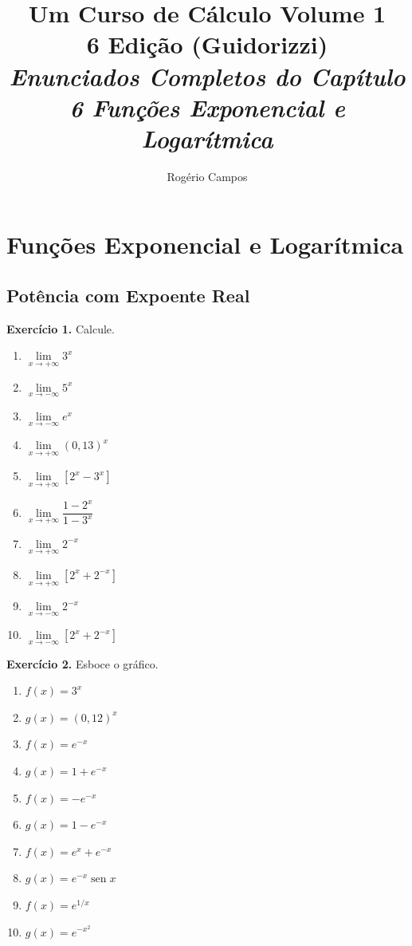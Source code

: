 \documentclass[12pt,a4paper]{article}
\title{
    \Huge \textbf{Um Curso de Cálculo Volume 1} \\
    \vspace{0.3cm}
    \Large 6\textordfeminine{} Edição (Guidorizzi) \\
    \vspace{0.5cm}
    \large \textit{Enunciados Completos do Capítulo 6 Funções Exponencial e Logarítmica}
}
\author{Rogério Campos}
\begin{document}
\maketitle
\newpage

\tableofcontents
\newpage

\setcounter{section}{5}
\setcounter{subsection}{0}

\section{Funções Exponencial e Logarítmica}

\subsection{Potência com Expoente Real}
\vspace{0.5cm}
\noindent\textbf{Exercício 1.} Calcule.
\begin{enumerate}
    \renewcommand{\theenumi}{\alph{enumi}}
    \renewcommand{\labelenumi}{\theenumi)}
    \item $\lim\limits_{x \to +\infty} 3^x$
    \item $\lim\limits_{x \to -\infty} 5^x$
    \item $\lim\limits_{x \to -\infty} e^x$
    \item $\lim\limits_{x \to +\infty} (0{,}13)^x$
    \item $\lim\limits_{x \to +\infty} [2^x - 3^x]$
    \item $\lim\limits_{x \to +\infty} \dfrac{1 - 2^x}{1 - 3^x}$
    \item $\lim\limits_{x \to +\infty} 2^{-x}$
    \item $\lim\limits_{x \to +\infty} [2^x + 2^{-x}]$
    \item $\lim\limits_{x \to -\infty} 2^{-x}$
    \item $\lim\limits_{x \to -\infty} [2^x + 2^{-x}]$
\end{enumerate}

\vspace{0.5cm}
\noindent\textbf{Exercício 2.} Esboce o gráfico.
\begin{enumerate}
    \renewcommand{\theenumi}{\alph{enumi}}
    \renewcommand{\labelenumi}{\theenumi)}
    \item $f(x) = 3^x$
    \item $g(x) = (0{,}12)^x$
    \item $f(x) = e^{-x}$
    \item $g(x) = 1 + e^{-x}$
    \item $f(x) = -e^{-x}$
    \item $g(x) = 1 - e^{-x}$
    \item $f(x) = e^x + e^{-x}$
    \item $g(x) = e^{-x}\operatorname{sen} x$
    \item $f(x) = e^{1/x}$
    \item $g(x) = e^{-x^2}$
\end{enumerate}
\end{document}
